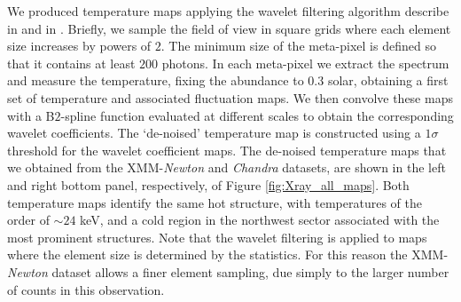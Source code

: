 \documentclass[twocolumn,traditabstract]{aa}
\begin{document}
We produced temperature maps applying the wavelet filtering algorithm describe in \cite{bourdin2004} and in \cite{bourdin2008}. Briefly, we sample the field of view in square grids where each element size increases by powers of $2$. The minimum size of the meta-pixel is defined so that it contains at least $200$ photons. In each meta-pixel we extract the spectrum and measure the temperature, fixing the abundance to $0.3$ solar, obtaining a first set of temperature and associated fluctuation maps. We then convolve these maps with a B$2$-spline function evaluated at different scales to obtain the corresponding wavelet coefficients. The `de-noised' temperature map is constructed using a $1\sigma$ threshold for the wavelet coefficient maps. The de-noised temperature maps that we obtained from the XMM-\textit{Newton} and \textit{Chandra} datasets, are shown in the left and right bottom panel, respectively, of Figure  \ref{fig:Xray_all_maps}. Both temperature maps identify the same hot structure, with temperatures of the order of $\sim 24$ keV, and a cold region in the northwest sector associated with the most prominent structures. Note that the wavelet filtering is applied to maps where the element size is determined by the statistics. For this reason the XMM-\textit{Newton} dataset allows a finer element sampling, due simply to the larger number of counts in this observation.
\end{document}
